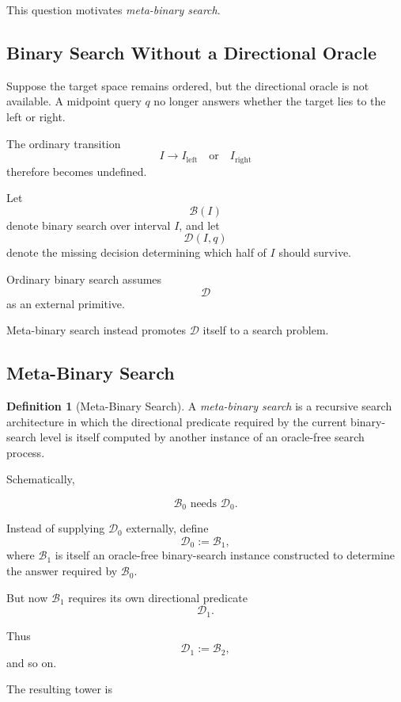 \documentclass[11pt]{article}
\theoremstyle{plain}
\theoremstyle{definition}
\newtheorem{definition}[theorem]{Definition}
\begin{document}
This question motivates \emph{meta-binary search}.

\subsection{Binary Search Without a Directional Oracle}

Suppose the target space remains ordered, but the directional oracle is not
available.  A midpoint query \(q\) no longer answers whether the target lies
to the left or right.

The ordinary transition
\[
    I
    \longrightarrow
    I_{\mathrm{left}}
    \quad\text{or}\quad
    I_{\mathrm{right}}
\]
therefore becomes undefined.

Let
\[
    \mathcal{B}(I)
\]
denote binary search over interval \(I\), and let
\[
    \mathcal{D}(I,q)
\]
denote the missing decision determining which half of \(I\) should survive.

Ordinary binary search assumes
\[
    \mathcal{D}
\]
as an external primitive.

Meta-binary search instead promotes \(\mathcal{D}\) itself to a search
problem.

\subsection{Meta-Binary Search}

\begin{definition}[Meta-Binary Search]
\label{def:meta-binary-search}
A \emph{meta-binary search} is a recursive search architecture in which the
directional predicate required by the current binary-search level is itself
computed by another instance of an oracle-free search process.
\end{definition}

Schematically,

\[
    \mathcal{B}_0
    \text{ needs }
    \mathcal{D}_0.
\]

Instead of supplying \(\mathcal{D}_0\) externally, define
\[
    \mathcal{D}_0
    :=
    \mathcal{B}_1,
\]
where \(\mathcal{B}_1\) is itself an oracle-free binary-search instance
constructed to determine the answer required by \(\mathcal{B}_0\).

But now \(\mathcal{B}_1\) requires its own directional predicate
\[
    \mathcal{D}_1.
\]

Thus
\[
    \mathcal{D}_1
    :=
    \mathcal{B}_2,
\]
and so on.

The resulting tower is
\end{document}
